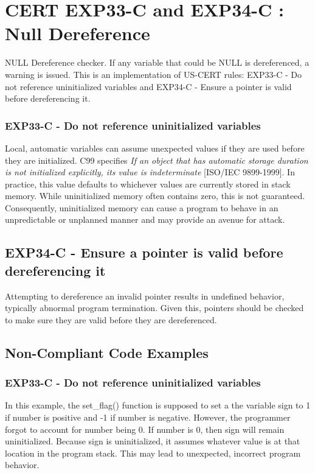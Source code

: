 \section{CERT EXP33-C and EXP34-C : Null Dereference}

NULL Dereference checker. If any variable that could be NULL is dereferenced, a warning is issued.
This is an implementation of US-CERT rules: EXP33-C - Do not reference uninitialized variables and
EXP34-C - Ensure a pointer is valid before dereferencing it.

\subsubsection{EXP33-C - Do not reference uninitialized variables}

Local, automatic variables can assume unexpected values if they are used before they are 
initialized. 
C99 specifies \emph{If an object that has automatic storage duration is not 
initialized explicitly, its value is indeterminate}
[ISO/IEC 9899-1999]. In practice, this value defaults to whichever values are currently stored in stack memory. 
While uninitialized memory often 
contains zero, this is not guaranteed. Consequently, uninitialized memory can cause a program 
to behave in an unpredictable or unplanned manner and may provide an avenue for attack.

\subsection{EXP34-C - Ensure a pointer is valid before dereferencing it}

Attempting to dereference an invalid pointer results in undefined behavior, 
typically abnormal program termination. Given this, pointers should be checked 
to make sure they are valid before they are dereferenced.

\subsection{Non-Compliant Code Examples}

\subsubsection{EXP33-C - Do not reference uninitialized variables}

In this example, the set\_flag() function is supposed to set a the variable sign to 1 if 
number is positive and -1 if number is negative. However, the programmer forgot 
to account for number being 0. If number is 0, then sign will remain uninitialized. 
Because sign is uninitialized, it assumes whatever value is at that location 
in the program stack. This may lead to unexpected, incorrect program behavior.


